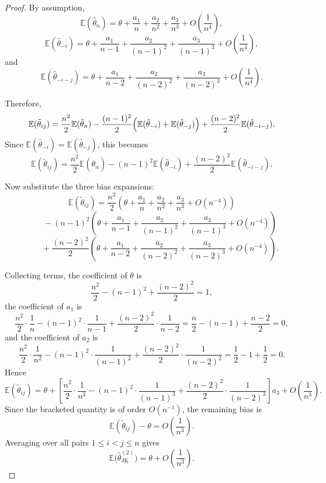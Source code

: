 \documentclass[11pt]{article}
\theoremstyle{definition}
\begin{document}
\begin{proof}
By assumption,
\[
\mathbb{E}(\hat\theta_n)
=
\theta+\frac{a_1}{n}+\frac{a_2}{n^2}+\frac{a_3}{n^3}+O\!\left(\frac{1}{n^4}\right),
\]
\[
\mathbb{E}(\hat\theta_{-i})
=
\theta+\frac{a_1}{n-1}+\frac{a_2}{(n-1)^2}+\frac{a_3}{(n-1)^3}
+O\!\left(\frac{1}{n^4}\right),
\]
and
\[
\mathbb{E}(\hat\theta_{-i-j})
=
\theta+\frac{a_1}{n-2}+\frac{a_2}{(n-2)^2}+\frac{a_3}{(n-2)^3}
+O\!\left(\frac{1}{n^4}\right).
\]

Therefore,
\[
\mathbb{E}(\tilde\theta_{ij})
=
\frac{n^2}{2}\mathbb{E}(\hat\theta_n)
-\frac{(n-1)^2}{2}\Bigl(\mathbb{E}(\hat\theta_{-i})+\mathbb{E}(\hat\theta_{-j})\Bigr)
+\frac{(n-2)^2}{2}\mathbb{E}(\hat\theta_{-i-j}).
\]
Since \(\mathbb{E}(\hat\theta_{-i})=\mathbb{E}(\hat\theta_{-j})\), this becomes
\[
\mathbb{E}(\tilde\theta_{ij})
=
\frac{n^2}{2}\mathbb{E}(\hat\theta_n)
-(n-1)^2\mathbb{E}(\hat\theta_{-i})
+\frac{(n-2)^2}{2}\mathbb{E}(\hat\theta_{-i-j}).
\]

Now substitute the three bias expansions:
\[
\mathbb{E}(\tilde\theta_{ij})
=
\frac{n^2}{2}
\left(
\theta+\frac{a_1}{n}+\frac{a_2}{n^2}+\frac{a_3}{n^3}+O(n^{-4})
\right)
\]
\[
\qquad
-(n-1)^2
\left(
\theta+\frac{a_1}{n-1}+\frac{a_2}{(n-1)^2}+\frac{a_3}{(n-1)^3}+O(n^{-4})
\right)
\]
\[
\qquad
+\frac{(n-2)^2}{2}
\left(
\theta+\frac{a_1}{n-2}+\frac{a_2}{(n-2)^2}+\frac{a_3}{(n-2)^3}+O(n^{-4})
\right).
\]

Collecting terms, the coefficient of \(\theta\) is
\[
\frac{n^2}{2}-(n-1)^2+\frac{(n-2)^2}{2}=1,
\]
the coefficient of \(a_1\) is
\[
\frac{n^2}{2}\cdot \frac{1}{n}
-(n-1)^2\cdot \frac{1}{n-1}
+\frac{(n-2)^2}{2}\cdot \frac{1}{n-2}
=
\frac{n}{2}-(n-1)+\frac{n-2}{2}=0,
\]
and the coefficient of \(a_2\) is
\[
\frac{n^2}{2}\cdot \frac{1}{n^2}
-(n-1)^2\cdot \frac{1}{(n-1)^2}
+\frac{(n-2)^2}{2}\cdot \frac{1}{(n-2)^2}
=
\frac12-1+\frac12=0.
\]
Hence
\[
\mathbb{E}(\tilde\theta_{ij})
=
\theta
+
\left[
\frac{n^2}{2}\cdot \frac{1}{n^3}
-(n-1)^2\cdot \frac{1}{(n-1)^3}
+\frac{(n-2)^2}{2}\cdot \frac{1}{(n-2)^3}
\right]a_3
+
O\!\left(\frac{1}{n^3}\right).
\]
Since the bracketed quantity is of order \(O(n^{-1})\), the remaining bias is
\[
\mathbb{E}(\tilde\theta_{ij})-\theta
=
O\!\left(\frac{1}{n^3}\right).
\]
Averaging over all pairs \(1\le i<j\le n\) gives
\[
\mathbb{E}\bigl(\hat\theta_{\mathrm{JK}}^{(2)}\bigr)
=
\theta+O\!\left(\frac{1}{n^3}\right).
\]
\end{proof}
\end{document}
